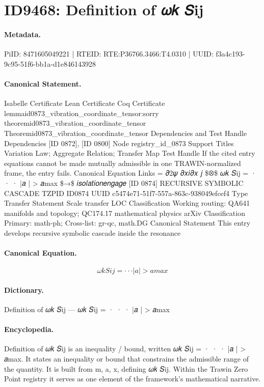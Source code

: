 \section*{ID9468: Definition of 𝜔𝑘 𝑆ij}
\paragraph{Metadata.}
PiID: 8471605049221 | RTEID: RTE:P36766.3466:T4.0310 | UUID: f3a4c193-9c95-51f6-bb1a-d1e846143928

\paragraph{Canonical Statement.}
Isabelle Certificate Lean Certificate Coq Certificate lemmaid0873\_vibration\_coordinate\_tensor:sorry theoremid0873\_vibration\_coordinate\_tensor Theoremid0873\_vibration\_coordinate\_tensor Dependencies and Test Handle Dependencies [ID 0872], [ID 0800] Node registry\_id\_0873 Support Titles Variation Law; Aggregate Relation; Transfer Map Test Handle If the cited entry equations cannot be made mutually admissible in one TRAWIN-normalized frame, the entry fails. Canonical Equation Links = 𝜕2𝜓 𝜕𝑥𝑖𝜕𝑥 𝑗 \$⊗\$ 𝜔𝑘 𝑆ij = · · · |𝑎 | > 𝑎max \$→\$ 𝑖𝑠𝑜𝑙𝑎𝑡𝑖𝑜𝑛𝑒𝑛𝑔𝑎𝑔𝑒 [ID 0874] RECURSIVE SYMBOLIC CASCADE TZPID ID0874 UUID c5474e71-51f7-557a-863c-938049efcef4 Type Transfer Statement Scale transfer LOC Classification Working routing: QA641 manifolds and topology; QC174.17 mathematical physics arXiv Classification Primary: math-ph; Cross-list: gr-qc, math.DG Canonical Statement This entry develops recursive symbolic cascade inside the resonance

\paragraph{Canonical Equation.}
\[
𝜔𝑘 𝑆ij = · · · |𝑎 | > 𝑎max
\]

\paragraph{Dictionary.}
Definition of 𝜔𝑘 𝑆ij — 𝜔𝑘 𝑆ij = · · · |𝑎 | > 𝑎max

\paragraph{Encyclopedia.}
Definition of 𝜔𝑘 𝑆ij is an inequality / bound, written 𝜔𝑘 𝑆ij = · · · |𝑎 | > 𝑎max. It states an inequality or bound that constrains the admissible range of the quantity. It is built from m, a, x, defining 𝜔𝑘 𝑆ij. Within the Trawin Zero Point registry it serves as one element of the framework's mathematical narrative.
